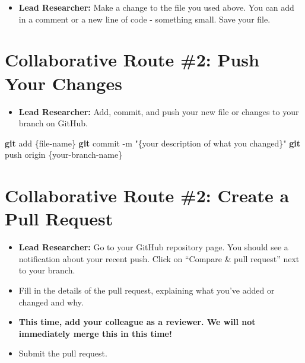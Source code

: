 \documentclass[
]{book}
\newenvironment{Shaded}{\begin{snugshade}}{\end{snugshade}}
\newcommand{\AttributeTok}[1]{\textcolor[rgb]{0.13,0.29,0.53}{#1}}
\newcommand{\FunctionTok}[1]{\textcolor[rgb]{0.13,0.29,0.53}{\textbf{#1}}}
\newcommand{\NormalTok}[1]{#1}
\newcommand{\StringTok}[1]{\textcolor[rgb]{0.31,0.60,0.02}{#1}}
\providecommand{\tightlist}{%
  \setlength{\itemsep}{0pt}\setlength{\parskip}{0pt}}
\begin{document}
\begin{itemize}
\tightlist
\item
  \textbf{Lead Researcher:} Make a change to the file you used above. You can add in a comment or a new line of code - something small. Save your file.
\end{itemize}

\hypertarget{collaborative-route-2-push-your-changes}{%
\section{Collaborative Route \#2: Push Your Changes}\label{collaborative-route-2-push-your-changes}}

\begin{itemize}
\tightlist
\item
  \textbf{Lead Researcher:} Add, commit, and push your new file or changes to your branch on GitHub.
\end{itemize}

\begin{Shaded}
\begin{Highlighting}[]
\FunctionTok{git}\NormalTok{ add \{file{-}name\}}
\FunctionTok{git}\NormalTok{ commit }\AttributeTok{{-}m} \StringTok{"\{your description of what you changed\}"}
\FunctionTok{git}\NormalTok{ push origin \{your{-}branch{-}name\}}
\end{Highlighting}
\end{Shaded}

\hypertarget{collaborative-route-2-create-a-pull-request}{%
\section{Collaborative Route \#2: Create a Pull Request}\label{collaborative-route-2-create-a-pull-request}}

\begin{itemize}
\tightlist
\item
  \textbf{Lead Researcher:} Go to your GitHub repository page. You should see a notification about your recent push. Click on ``Compare \& pull request'' next to your branch.
\item
  Fill in the details of the pull request, explaining what you've added or changed and why.
\item
  \textbf{This time, add your colleague as a reviewer. We will not immediately merge this in this time!}
\item
  Submit the pull request.
\end{itemize}
\end{document}
